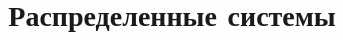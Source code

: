 \documentclass[12pt, a4paper, oneside]{book}
\title{\textbf{Распределенные системы}}
\author{
\\
\\
}
\date{}
\begin{document}
\maketitle
\mainmatter
\tableofcontents
\pagebreak




\end{document}
